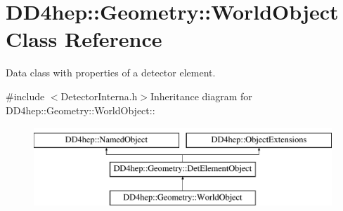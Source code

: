 \hypertarget{class_d_d4hep_1_1_geometry_1_1_world_object}{
\section{DD4hep::Geometry::WorldObject Class Reference}
\label{class_d_d4hep_1_1_geometry_1_1_world_object}
}


Data class with properties of a detector element.  


{\ttfamily \#include $<$DetectorInterna.h$>$}Inheritance diagram for DD4hep::Geometry::WorldObject::\begin{figure}[H]
\begin{center}
\leavevmode
\includegraphics[height=3cm]{class_d_d4hep_1_1_geometry_1_1_world_object}
\end{center}
\end{figure}
